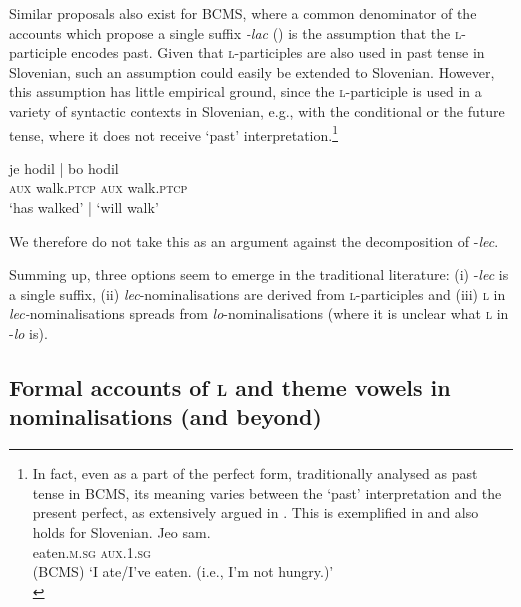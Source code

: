 \documentclass[output=paper,colorlinks,citecolor=brown]{langscibook}
\begin{document}
Similar proposals also exist for BCMS, where a common denominator of the accounts which propose a single suffix \textit{-lac} (\cite{maretic1963, babic1986tvorba, klajntvorbasufiksacija}) is the assumption that the \textsc{l}-participle encodes past. Given that \textsc{l}-participles are also used in past tense in Slovenian, such an assumption could easily be extended to Slovenian. However, this assumption has little empirical ground, since the \textsc{l}-participle is used in a variety of syntactic contexts in Slovenian, e.g., with the conditional or the future tense, where it does not receive `past' interpretation.\footnote{In fact, even as a part of the perfect form, traditionally analysed as past tense in BCMS, its meaning varies between the `past' interpretation and the present perfect, as extensively argued in \citet{todorovic2016}. This is exemplified in  and also holds for Slovenian. 
\ea \label{neda} \gll Jeo sam. \\
   eaten.\textsc{m.sg} \textsc{aux.1.sg} \\\hfill (BCMS) 
 \glt `I ate/I've eaten. (i.e., I'm not hungry.)' \\ 
 \z



}

\ea \glll je hodil | bo hodil  \\
   \textsc{aux} walk.\textsc{ptcp} {} \textsc{aux} walk.\textsc{ptcp} \\
  `has walked' | `will walk' \\ 
 \z  

\noindent We therefore do not take this as an argument against the decomposition of -\textit{lec}. 

Summing up, three options seem to emerge in the traditional literature: (i) -\textit{lec} is a single suffix, (ii) \textit{lec}-nominalisations are derived from \textsc{l}-participles and (iii) \textsc{l} in \textit{lec-}nominalisations spreads from \textit{lo}-nominalisations (where it is unclear what \textsc{l} in -\textit{lo} is).    

\subsection{Formal accounts of \textsc{l} and theme vowels in nominalisations (and beyond)} \label{Formal (DM) and beyond}
\end{document}

